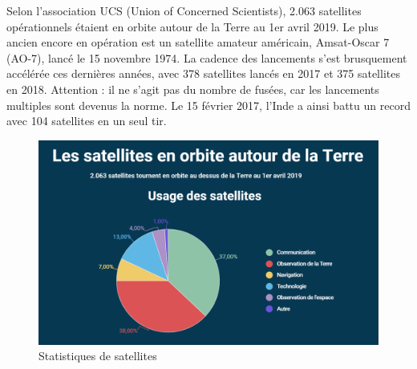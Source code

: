 \documentclass[12pt, openany]{report}
\begin{document}
Selon l'association UCS (Union of Concerned Scientists), 2.063 satellites opérationnels étaient en orbite autour de la Terre au 1er avril 2019. Le plus ancien encore en opération est un satellite amateur américain, Amsat-Oscar 7 (AO-7), lancé le 15 novembre 1974. La cadence des lancements s'est brusquement accélérée ces dernières années, avec 378 satellites lancés en 2017 et 375 satellites en 2018. Attention : il ne s'agit pas du nombre de fusées, car les lancements multiples sont devenus la norme. Le 15 février 2017, l'Inde a ainsi battu un record avec 104 satellites en un seul tir.\cite{orbite}

\begin{figure}[hp]
\centering
\includegraphics[scale=0.6]{satellite.png}
\caption{Statistiques de satellites}
\end{figure}
\end{document}
